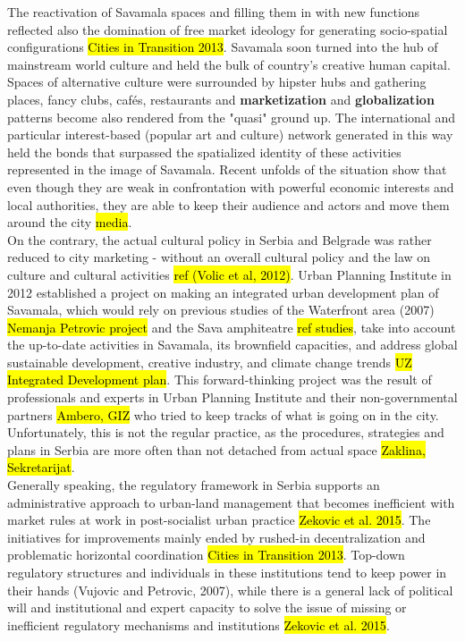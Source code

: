 \documentclass[11pt]{report}
\begin{document}
The reactivation of Savamala spaces and filling them in with new functions reflected also the domination of free market ideology for generating socio-spatial configurations \hl{Cities in Transition 2013}.
Savamala soon turned into the hub of mainstream world culture  and held the bulk of country's creative human capital.
Spaces of alternative culture were surrounded by hipster hubs and gathering places, fancy clubs, cafés, restaurants and \textbf{marketization} and \textbf{globalization} patterns become also rendered from the "quasi" ground up.
The international and particular interest-based (popular art and culture) network generated in this way held the bonds that surpassed the spatialized identity of these activities represented in the image of Savamala. Recent unfolds of the situation show that even though they are weak in confrontation with powerful economic interests and local authorities, they are able to keep their audience and actors and move them around the city \hl{media}.
\\
On the contrary, the actual cultural policy in Serbia and Belgrade was rather reduced to city marketing - without an overall cultural policy and the law on culture and cultural activities \hl{ref (Volic et al, 2012)}.
Urban Planning Institute in 2012 established a project on making an integrated urban development plan of Savamala, which would rely on previous studies of the Waterfront area (2007) \hl{Nemanja Petrovic project} and the Sava amphiteatre \hl{ref studies}, take into account the up-to-date activities in Savamala, its brownfield capacities, and address global sustainable development, creative industry, and climate change trends \hl{UZ Integrated Development plan}.
This forward-thinking project was the result of professionals and experts in Urban Planning Institute and their non-governmental partners \hl{Ambero, GIZ} who tried to keep tracks of what is going on in the city. Unfortunately, this is not the regular practice, as the procedures, strategies and plans in Serbia are more often than not detached from actual space \hl{Zaklina, Sekretarijat}.
\\
Generally speaking, the regulatory framework in Serbia supports an administrative approach to urban-land management that becomes inefficient with market rules at work in post-socialist urban practice \hl{Zekovic et al. 2015}.
The initiatives for improvements mainly ended by rushed-in decentralization and problematic horizontal coordination
\hl{Cities in Transition 2013}.
Top-down regulatory structures and individuals in these institutions tend to keep power in their hands (Vujovic and Petrovic, 2007), while there is a general lack of political will and institutional and expert capacity to solve the issue of missing or inefficient regulatory mechanisms and institutions \hl{Zekovic et al. 2015}.
\end{document}
